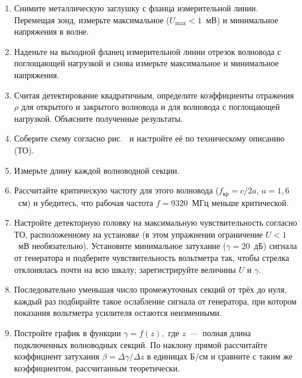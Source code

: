 \begin{lab:task}
\begin{enumerate}

    \item Снимите металлическую заглушку с фланца измерительной линии. Перемещая зонд, измерьте максимальное ($U_{\text{max}}<1$~мВ) и минимальное напряжения в волне.
    
   \item Наденьте на выходной фланец измерительной линии отрезок волновода с поглощающей нагрузкой и снова измерьте максимальное и минимальное напряжения.
   
   \item Считая детектирование квадратичным, определите коэффициенты отражения $\rho$ для открытого и закрытого волновода и для волновода с поглощающей нагрузкой. Объясните полученные результаты. 

   
	\item Соберите схему согласно рис.~ и настройте её по техническому описанию (ТО).
  
  \item Измерьте длину каждой волноводной секции.
  
  \item Рассчитайте критическую частоту для этого волновода ($f_{\text{кр}}=c/2a$, $a=1,6$~см) и убедитесь, что рабочая частота $f=9320$~МГц меньше критической.


   \item Настройте детекторную головку на максимальную чувствительность согласно ТО, расположенному на установке (в этом упражнении ограничение $U<1$~мВ необязательно). Установите минимальное затухание ($\gamma=20$~дБ) сигнала от генератора и подберите чувствительность вольтметра так, чтобы стрелка отклонялась почти на всю шкалу; зарегистрируйте величины $U$ и $\gamma.$
   
   \item Последовательно уменьшая число промежуточных секций от трёх до нуля, каждый раз подбирайте такое ослабление сигнала от генератора, при котором показания вольтметра усилителя остаются неизменными.
   
  \item Постройте график в функции $\gamma=f(z),$ где $z$~---~полная длина подключенных волноводных секций. По наклону прямой рассчитайте коэффициент затухания $\beta=\Delta\gamma/\Delta z$ в единицах $\text{Б}/\text{см}$ и сравните с таким же коэффициентом, рассчитанным теоретически.
	\end{enumerate}
\end{lab:task}

